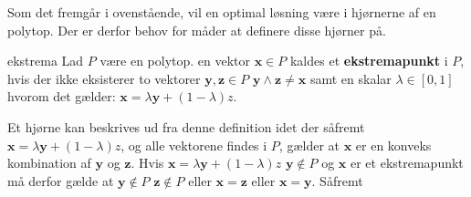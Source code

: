 Som det fremgår i ovenstående, vil en optimal løsning være i hjørnerne af en polytop.
Der er derfor behov for måder at definere disse hjørner på.

\begin{defn}{}{ekstrema}
Lad $P$ være en polytop. en vektor $\mathbf{x} \in P$ kaldes et \textbf{ekstremapunkt} i $P$, hvis der ikke eksisterer to vektorer $\mathbf{y},\mathbf{z} \in P$ $\mathbf{y} \land \mathbf{z} \neq \mathbf{x}$ samt en skalar $\lambda \in [0,1]$ hvorom det gælder: $\mathbf{x}=\lambda\mathbf{y}+(1-\lambda)z$.
\end{defn}
Et hjørne kan beskrives ud fra denne definition idet der såfremt $\mathbf{x}=\lambda\mathbf{y}+(1-\lambda)z$, og alle vektorene findes i $P$, gælder at $\mathbf{x}$ er en konveks kombination af $\mathbf{y}$ og $\mathbf{z}$.
Hvis $\mathbf{x}=\lambda\mathbf{y}+(1-\lambda)z$ $\mathbf{y}\notin P$ og $\mathbf{x}$ er et ekstremapunkt må derfor gælde at $\mathbf{y}\notin P$ $\mathbf{z}\notin P$ eller $\mathbf{x}=\mathbf{z}$ eller $\mathbf{x}=\mathbf{y}$. Såfremt 